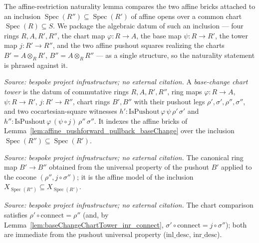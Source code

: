 The affine-restriction naturality lemma compares the two affine bricks attached to an
inclusion \(\operatorname{Spec}(R'') \subseteq \operatorname{Spec}(R')\) of affine opens
over a common chart \(\operatorname{Spec}(R) \subseteq S\). We package the algebraic datum
of such an inclusion --- four rings \(R, A, R', R''\), the chart map \(\varphi : R \to A\),
the base map \(\psi : R \to R'\), the tower map \(j : R' \to R''\), and the two affine
pushout squares realizing the charts \(B' = A \otimes_R R'\), \(B'' = A \otimes_R R''\) ---
as a single structure, so the naturality statement is phrased against it.

\begin{definition}
  \label{def:baseChangeChartTower}
  \textit{Source: bespoke project infrastructure; no external citation.}
  A \emph{base-change chart tower} is the datum of commutative rings \(R, A, R', R''\),
  ring maps \(\varphi : R \to A\), \(\psi : R \to R'\), \(j : R' \to R''\), chart rings
  \(B', B''\) with their pushout legs \(\rho', \sigma', \rho'', \sigma''\), and two
  cocartesian-square witnesses \(h' : \mathrm{IsPushout}\,\varphi\,\psi\,\rho'\,\sigma'\)
  and \(h'' : \mathrm{IsPushout}\,\varphi\,(\psi \circ j)\,\rho''\,\sigma''\). It indexes
  the affine bricks of Lemma~\ref{lem:affine_pushforward_pullback_baseChange} over the
  inclusion \(\operatorname{Spec}(R'') \subseteq \operatorname{Spec}(R')\).
\end{definition}

\begin{definition}
  \label{def:baseChangeChartTower_connect}
  \textit{Source: bespoke project infrastructure; no external citation.}
  The canonical ring map \(B' \to B''\) obtained from the universal property of the
  pushout \(B'\) applied to the cocone \((\rho'', j \circ \sigma'')\); it is the affine
  model of the inclusion \(X_{\operatorname{Spec}(R'')} \subseteq X_{\operatorname{Spec}(R')}\).
\end{definition}

\begin{lemma}
  \label{lem:baseChangeChartTower_inl_connect}
  \textit{Source: bespoke project infrastructure; no external citation.}
  The chart comparison satisfies \(\rho' \circ \mathrm{connect} = \rho''\) (and, by
  Lemma~\ref{lem:baseChangeChartTower_inr_connect}, \(\sigma' \circ \mathrm{connect}
  = j \circ \sigma''\)); both are immediate from the pushout universal property
  (\(\mathrm{inl\_desc}\), \(\mathrm{inr\_desc}\)).
\end{lemma}

